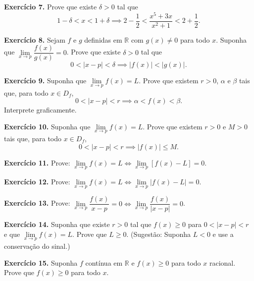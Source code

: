 \documentclass[12pt,a4paper]{article}
\begin{document}
\vspace{0.5cm}
\noindent\textbf{Exercício 7.}
Prove que existe $\delta > 0$ tal que
\[
1 - \delta < x < 1 + \delta \implies 2 - \dfrac{1}{2} < \dfrac{x^5 + 3x}{x^2 + 1} < 2 + \dfrac{1}{2}.
\]

\vspace{0.5cm}
\noindent\textbf{Exercício 8.}
Sejam $f$ e $g$ definidas em $\mathbb{R}$ com $g(x) \neq 0$ para todo $x$. Suponha que $\lim\limits_{x \to p} \dfrac{f(x)}{g(x)} = 0$. Prove que existe $\delta > 0$ tal que
\[
0 < |x - p| < \delta \implies |f(x)| < |g(x)|.
\]

\vspace{0.5cm}
\noindent\textbf{Exercício 9.}
Suponha que $\lim\limits_{x \to p} f(x) = L$. Prove que existem $r > 0$, $\alpha$ e $\beta$ tais que, para todo $x \in D_f$,
\[
0 < |x - p| < r \implies \alpha < f(x) < \beta.
\]
Interprete graficamente.

\vspace{0.5cm}
\noindent\textbf{Exercício 10.}
Suponha que $\lim\limits_{x \to p} f(x) = L$. Prove que existem $r > 0$ e $M > 0$ tais que, para todo $x \in D_f$,
\[
0 < |x - p| < r \implies |f(x)| \le M.
\]

\vspace{0.5cm}
\noindent\textbf{Exercício 11.}
Prove: $\lim\limits_{x \to p} f(x) = L \iff \lim\limits_{x \to p} [f(x) - L] = 0$.

\vspace{0.5cm}
\noindent\textbf{Exercício 12.}
Prove: $\lim\limits_{x \to p} f(x) = L \iff \lim\limits_{x \to p} |f(x) - L| = 0$.

\vspace{0.5cm}
\noindent\textbf{Exercício 13.}
Prove: $\lim\limits_{x \to p} \dfrac{f(x)}{x - p} = 0 \iff \lim\limits_{x \to p} \dfrac{f(x)}{|x - p|} = 0$.

\vspace{0.5cm}
\noindent\textbf{Exercício 14.}
Suponha que existe $r > 0$ tal que $f(x) \ge 0$ para $0 < |x - p| < r$ e que $\lim\limits_{x \to p} f(x) = L$. Prove que $L \ge 0$. (Sugestão: Suponha $L < 0$ e use a conservação do sinal.)

\vspace{0.5cm}
\noindent\textbf{Exercício 15.}
Suponha $f$ contínua em $\mathbb{R}$ e $f(x) \ge 0$ para todo $x$ racional. Prove que $f(x) \ge 0$ para todo $x$.
\end{document}
